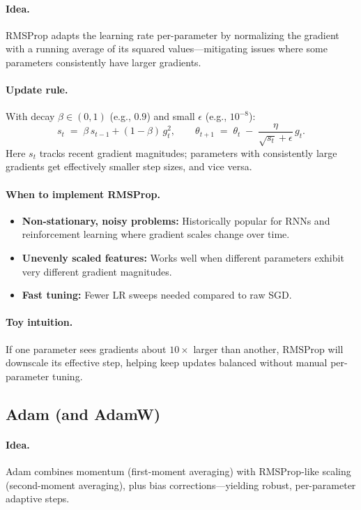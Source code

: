 \documentclass[12pt,a4paper]{report}
\begin{document}
\paragraph{Idea.}
RMSProp adapts the learning rate per-parameter by normalizing the gradient with a running average of its squared values—mitigating issues where some parameters consistently have larger gradients.

\paragraph{Update rule.}
With decay $\beta \in (0,1)$ (e.g., $0.9$) and small $\epsilon$ (e.g., $10^{-8}$):
\[
s_t \;=\; \beta\, s_{t-1} + (1-\beta)\, g_t^2, \qquad
\theta_{t+1} \;=\; \theta_t \;-\; \frac{\eta}{\sqrt{s_t}+\epsilon}\, g_t.
\]
Here $s_t$ tracks recent gradient magnitudes; parameters with consistently large gradients get effectively smaller step sizes, and vice versa.

\paragraph{When to implement RMSProp.}
\begin{itemize}
    \item \textbf{Non-stationary, noisy problems:} Historically popular for RNNs and reinforcement learning where gradient scales change over time.
    \item \textbf{Unevenly scaled features:} Works well when different parameters exhibit very different gradient magnitudes.
    \item \textbf{Fast tuning:} Fewer LR sweeps needed compared to raw SGD.
\end{itemize}

\paragraph{Toy intuition.}
If one parameter sees gradients about $10\times$ larger than another, RMSProp will downscale its effective step, helping keep updates balanced without manual per-parameter tuning.

\vspace{1em}
\subsection{Adam (and AdamW)}

\paragraph{Idea.}
Adam combines momentum (first-moment averaging) with RMSProp-like scaling (second-moment averaging), plus bias corrections—yielding robust, per-parameter adaptive steps.
\end{document}
